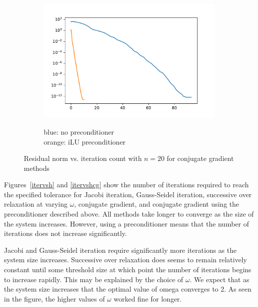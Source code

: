 \documentclass[10pt]{article}
\begin{document}
\begin{solution}[Solution]
\begin{figure}[H]
\end{figure}
\begin{figure}[H]\centering
    \begin{subfigure}{.6\textwidth}
        \includegraphics[width=\textwidth]{img/1/cg_convergence_20.pdf}
    \end{subfigure}
    \begin{subfigure}{.25\textwidth}
        blue: no preconditioner \\
        orange: iLU preconditioner
    \end{subfigure}
\caption{Residual norm vs. iteration count with \( n=20 \) for conjugate gradient methods}
\label{convergence}
\end{figure}

Figures~\ref{itervsh} and \ref{itervshcg} show the number of iterations required to reach the specified tolerance for Jacobi iteration, Gauss-Seidel iteration, successive over relaxation at varying \( \omega \), conjugate gradient, and conjugate gradient using the preconditioner described above. All methods take longer to converge as the size of the system increases. However, using a preconditioner means that the number of iterations does not increase significantly.

Jacobi and Gauss-Seidel iteration require significantly more iterations as the system size increases. Successive over relaxation does seems to remain relatively constant until some threshold size at which point the number of iterations begins to increase rapidly. This may be explained by the choice of \( \omega \). We expect that as the system size increases that the optimal value of omega converges to 2. As seen in the figure, the higher values of \( \omega \) worked fine for longer.


\end{solution}
\end{document}
